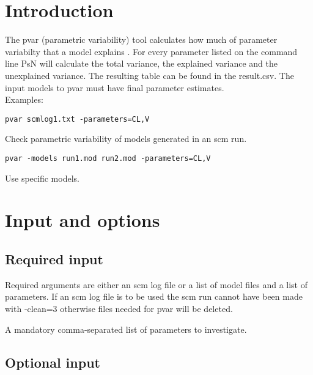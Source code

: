 
\usepackage{hyperref}
\newcommand{\guidetoolname}{pvar}



\maketitle
\tableofcontents
\newpage


\section{Introduction}
The pvar (parametric variability) tool calculates how much of parameter variabilty that a model explains \cite{Hennig}. For every parameter listed on the command line PsN will calculate the total variance, the explained variance and the unexplained variance. The resulting table can be found in the result.csv. The input models to pvar must have final parameter estimates.\\
Examples:
\begin{verbatim}
pvar scmlog1.txt -parameters=CL,V
\end{verbatim}
Check parametric variability of models generated in an scm run.
\begin{verbatim}
pvar -models run1.mod run2.mod -parameters=CL,V
\end{verbatim}
Use specific models.
\section{Input and options}

\subsection{Required input}
Required arguments are either an scm log file or a list of model files and a list of parameters. If an scm log file is to be used the scm run cannot have been made with -clean=3 otherwise files needed for pvar will be deleted.

\begin{optionlist}
A mandatory comma-separated list of parameters to investigate.
\nextopt
\end{optionlist}

\subsection{Optional input}

